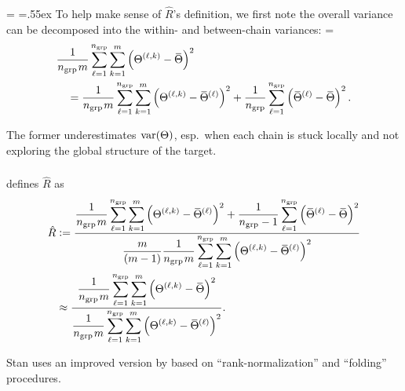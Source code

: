 \documentclass[18pt]{beamer}
\newcommand{\tightSpacing}[2][.55ex]{%
  \begingroup%
    \dimen0=\fontdimen2\font
    \fontdimen2\font=#1
    #2%
    \fontdimen2\font=\dimen0
  \endgroup%
}
\newcommand{\defeq}{\vcentcolon =} %
\newcommand{\thinnerspace}{\mskip.5\thinmuskip}
\newcommand{\randVar}{\Theta}
\newcommand{\mcIndex}{k}
\newcommand{\mcSampleSize}{m}
\begin{document}
\begin{frame}
\frametitle{\frametitleText}
\tightSpacing{%
To help make sense of $\hat{R}$'s definition, we first note the overall variance can be decomposed into the within- and between-chain variances:%
}%
{\setlength{\abovedisplayskip}{.5\baselineskip}
\setlength{\belowdisplayskip}{.5\baselineskip}
\begin{align*}
&\frac{1}{n_\mathrm{grp} \thinnerspace \mcSampleSize} 
\sum_{\ell = 1}^{n_\mathrm{grp}} \sum_{\mcIndex = 1}^{\mcSampleSize} \left(
	\randVar^{(\ell, \mcIndex)} - \overallAve
\right)^2 \\
&\hspace*{1em}= 
	\frac{1}{n_\mathrm{grp} \thinnerspace \mcSampleSize} 
	\sum_{\ell = 1}^{n_\mathrm{grp}} \sum_{\mcIndex = 1}^{\mcSampleSize} \left(
		\randVar^{(\ell, \mcIndex)} - \chainAve
	\right)^2
	+
	\frac{1}{n_\mathrm{grp}} 
	\sum_{\ell = 1}^{n_\mathrm{grp}} \left(
		\chainAve - \overallAve
	\right)^2.
\end{align*}}%

The former underestimates $\thinnerspace\operatorname{var}(\randVar)$, esp.\ when each chain is stuck locally and not exploring the global structure of the target.
\end{frame}


\begin{frame}
\frametitle{\frametitleText}
\vspace*{-.25\baselineskip}
\cite{gelman1992rhat} defines $\hat{R}$ as
{\setlength{\abovedisplayskip}{.4\baselineskip}
\setlength{\belowdisplayskip}{.2\baselineskip}
\begin{align*}
\hat{R} 
&\defeq
\frac{\displaystyle
	\frac{1}{n_\mathrm{grp} \thinnerspace \mcSampleSize} 
	\sum_{\ell = 1}^{n_\mathrm{grp}} \sum_{\mcIndex = 1}^{\mcSampleSize} \left(
		\randVar^{(\ell, \mcIndex)} - \chainAve
	\right)^2
	+
	\frac{1}{n_\mathrm{grp} - 1} 
	\sum_{\ell = 1}^{n_\mathrm{grp}} \left(
		\chainAve - \overallAve
	\right)^2
}{\displaystyle
	\frac{\mcSampleSize}{(\mcSampleSize - 1)}
	\frac{1}{n_\mathrm{grp} \thinnerspace \mcSampleSize} 
	\sum_{\ell = 1}^{n_\mathrm{grp}} \sum_{\mcIndex = 1}^{\mcSampleSize} \left(
		\randVar^{(\ell, \mcIndex)} - \chainAve
	\right)^2
} \\
&\approx 
\frac{\displaystyle
	\frac{1}{n_\mathrm{grp} \thinnerspace \mcSampleSize} 
	\sum_{\ell = 1}^{n_\mathrm{grp}} \sum_{\mcIndex = 1}^{\mcSampleSize} \left(
		\randVar^{(\ell, \mcIndex)} - \overallAve
	\right)^2
}{\displaystyle
	\frac{1}{n_\mathrm{grp} \thinnerspace \mcSampleSize} 
	\sum_{\ell = 1}^{n_\mathrm{grp}} \sum_{\mcIndex = 1}^{\mcSampleSize} \left(
		\randVar^{(\ell, \mcIndex)} - \chainAve
	\right)^2
}.
\end{align*}}%

\pause
Stan uses an improved version by \cite{vehtari2021improved_rhat} based on ``rank-normalization'' and ``folding'' procedures.
\end{frame}
\end{document}
